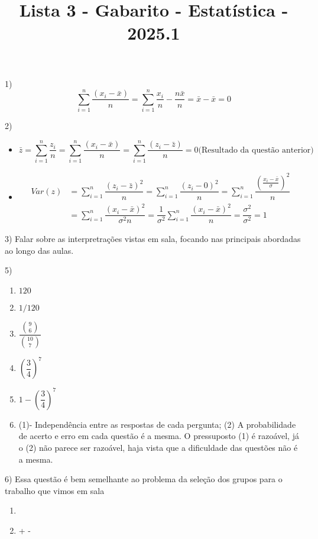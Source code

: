 \documentclass{article}
\title{Lista 3 - Gabarito - Estatística  - 2025.1}
\begin{document}
\date{}
\maketitle

1) $$\sum_{i=1}^n \dfrac{(x_i - \bar{x})}{n} = \sum_{i=1}^n \dfrac{x_i}{n} -  \dfrac{n\bar{x}}{n}  = \bar{x} - \bar{x} = 0$$

2) \begin{itemize}
    \item $$\bar{z} = \sum_{i=1}^n \dfrac{z_i}{n} = \sum_{i=1}^n \dfrac{(x_i - \bar{x})}{n} =  \sum_{i=1}^n \dfrac{(z_i - \bar{z})}{n} = 0 \text{(Resultado da questão anterior)}  $$
    \item \begin{align*}
      Var(z) &= \sum_{i=1}^n \dfrac{(z_i - \bar{z})^2}{n}
      =  \sum_{i=1}^n \dfrac{(z_i - 0)^2}{n}
      = \sum_{i=1}^n \dfrac{\left(\frac{x_i - \bar{x}}{\sigma}\right)^2}{n}\\
      &= \sum_{i=1}^n \dfrac{\left(x_i - \bar{x}\right)^2}{\sigma^2 n}
       = \dfrac{1}{\sigma^2} \sum_{i=1}^n \dfrac{\left(x_i - \bar{x}\right)^2}{n}
      = \dfrac{\sigma^2}{\sigma^2} = 1
    \end{align*}
    \end{itemize}
    
    
 3) Falar sobre as interpretrações vistas em sala, focando nas principais abordadas ao longo das aulas.

 5) 
 \begin{enumerate}
    \item $120$
    \item $1/120$
    \item $\dfrac{\binom{9}{6}}{\binom{10}{7}}$
    \item $\left(\dfrac{3}{4}\right)^7$
    \item $1 - \left(\dfrac{3}{4}\right)^7$
    \item (1)- Independência entre as respostas de cada pergunta; (2) A probabilidade de acerto e erro em cada questão é a mesma.
     O pressuposto (1) é razoável, já o (2) não parece ser razoável, haja vista que a dificuldade das questões não é a mesma. 
 \end{enumerate}

 6) Essa questão é bem semelhante ao problema da seleção dos grupos para o trabalho que vimos em sala

 \begin{enumerate}
    \item {}
    \item {} +  -  
 \end{enumerate}
\end{document}
